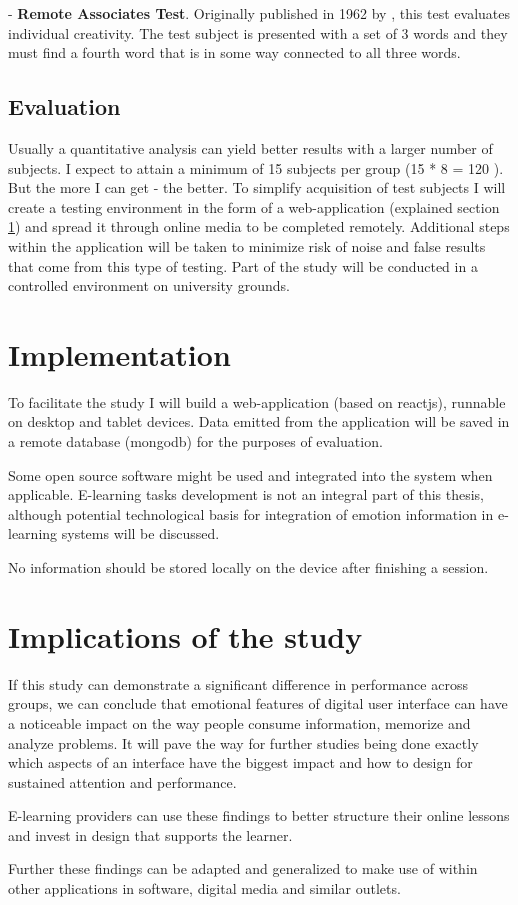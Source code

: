 - \textbf{Remote Associates Test}. Originally published in 1962 by \cite[p.226 ff]{Mednick1962}, this test evaluates individual creativity. 
The test subject is presented with a set of 3 words and they must find a fourth word that is in some way connected to all three words.

\subsection{Evaluation}

Usually a quantitative analysis can yield better results with a larger number of subjects.
I expect to attain a minimum of 15 subjects per group (15 * 8 = 120 ). But the more I can get - the better.
To simplify acquisition of test subjects I will create a testing environment in the form of a web-application (explained section \ref{implementation}) and spread it through online media to be completed remotely.
Additional steps within the application will be taken to minimize risk of noise and false results that come from this type of testing. Part of the study will be conducted in a controlled environment on university grounds.

\section{Implementation} \label{implementation}

To facilitate the study I will build a web-application (based on reactjs), runnable on desktop and tablet devices. Data emitted from the application will be saved in a remote database (mongodb) for the purposes of evaluation.

Some open source software might be used and integrated into the system when applicable. E-learning tasks development is not an integral part of this thesis, although potential technological basis for integration of emotion information in e-learning systems will be discussed.

No information should be stored locally on the device after finishing a session.

\section{Implications of the study}

If this study can demonstrate a significant difference in performance across groups, we can conclude that emotional features of digital user interface can have a noticeable impact on the way people consume information, memorize and analyze problems.
It will pave the way for further studies being done exactly which aspects of an interface have the biggest impact and how to design for sustained attention and performance.

E-learning providers can use these findings to better structure their online lessons and invest in design that supports the learner.

Further these findings can be adapted and generalized to make use of within other applications in software, digital media and similar outlets.

